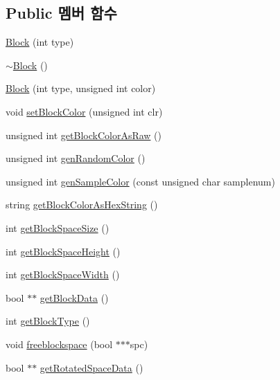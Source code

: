 \subsection*{Public 멤버 함수}
\begin{DoxyCompactItemize}
\item 
\hyperlink{class_tetris_1_1_block_a1fd0aaff1f4b622c9c7027929c5d4534}{Block} (int type)
\item 
\hyperlink{class_tetris_1_1_block_a20012167d55a996d56825d99082419c6}{$\sim$\+Block} ()
\item 
\hyperlink{class_tetris_1_1_block_a82c3ff96d106bd1da7b32f2addd7db7f}{Block} (int type, unsigned int color)
\item 
void \hyperlink{class_tetris_1_1_block_a1a3fab9e7eabe64a4ba588ed5091d3a9}{set\+Block\+Color} (unsigned int clr)
\item 
unsigned int \hyperlink{class_tetris_1_1_block_a8f6bd5020dcfdae501f74b42827344f3}{get\+Block\+Color\+As\+Raw} ()
\item 
unsigned int \hyperlink{class_tetris_1_1_block_a4bae85cab786853cb3ff76aa7fe72edc}{gen\+Random\+Color} ()
\item 
unsigned int \hyperlink{class_tetris_1_1_block_a9cac65704d2c788488ecf65d5b0467bd}{gen\+Sample\+Color} (const unsigned char samplenum)
\item 
string \hyperlink{class_tetris_1_1_block_a0adf3e3fbe9899115703913f18aaae6d}{get\+Block\+Color\+As\+Hex\+String} ()
\item 
int \hyperlink{class_tetris_1_1_block_a356cba210ff93bbd80c10d4d00c81cc2}{get\+Block\+Space\+Size} ()
\item 
int \hyperlink{class_tetris_1_1_block_a5301977e32c03aaf122fa289fcba77ba}{get\+Block\+Space\+Height} ()
\item 
int \hyperlink{class_tetris_1_1_block_ac390e14de476582300d815d9054ed9bd}{get\+Block\+Space\+Width} ()
\item 
bool $\ast$$\ast$ \hyperlink{class_tetris_1_1_block_a9bd2c3d6ccacff9a5f56f72336ba324f}{get\+Block\+Data} ()
\item 
int \hyperlink{class_tetris_1_1_block_a8780b7c5d836c3bb6bae3de5cdcba5e1}{get\+Block\+Type} ()
\item 
void \hyperlink{class_tetris_1_1_block_aea78e0a1b229842f541a8e897e2e9340}{freeblockspace} (bool $\ast$$\ast$$\ast$spc)
\item 
bool $\ast$$\ast$ \hyperlink{class_tetris_1_1_block_a464ed776185993ad827f316a08969960}{get\+Rotated\+Space\+Data} ()
\item 

\end{DoxyCompactItemize}

